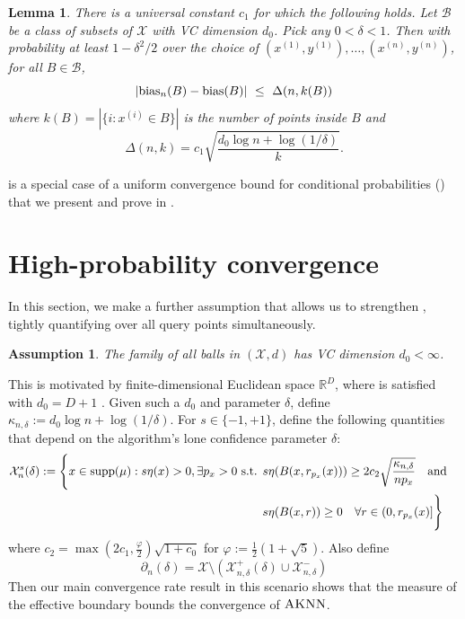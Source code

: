 \documentclass{article}
\def\X{{\mathcal X}}
\def\B{{\mathcal B}}
\def\bias{{\rm bias}}
\def\supp{{\rm supp}}
\newcommand{\algname}{\textsc{AKNN}}
\newtheorem{lemma}[theorem]{Lemma}
\newtheorem{assump}{Assumption}
\begin{document}
\begin{lemma}
There is a universal constant $c_1$ for which the following holds. Let $\B$ be a class of subsets of $\X$ with VC dimension $d_0$. Pick any $0 < \delta < 1$. Then with probability at least $1-\delta^2/2$ over the choice of $(x^{(1)}, y^{(1)}), \ldots, (x^{(n)}, y^{(n)})$, for all $B \in \B$,
  $$ \left| \bias_n(B) - \bias(B) \right| \ \leq \ \Delta(n, k(B)) $$
where $k(B) = |\{i: x^{(i)} \in B\}|$ is the number of points inside $B$ and 
\begin{equation}
\Delta(n,k) = c_1 \sqrt{\frac{d_0 \log n + \log (1/\delta)}{k}} .
\label{eq:delta-defn}
\end{equation}
\label{lemma:bias}
\end{lemma}

 is a special case of a uniform convergence bound for conditional probabilities () 
that we present and prove in .

\section{High-probability convergence}

In this section, we make a further assumption that allows us to strengthen , tightly quantifying over all query points simultaneously. 
\begin{assump}
\label{assump:VCallballs}
The family of all balls in $(\X, d)$ has VC dimension $d_0 < \infty$.
\end{assump}
This is motivated by finite-dimensional Euclidean space $\mathbb{R}^{D}$, where  is satisfied with $d_0 = D+1$ \citep{dudley79}. Given such a $d_0$ and parameter $\delta$, define $\kappa_{n, \delta} := d_0 \log n + \log (1/\delta)$. 
For $s \in \{ -1, +1 \}$, define the following quantities that depend on the algorithm's lone confidence parameter $\delta$:
\begin{align*}
\X^{s}_n (\delta)
:= \Bigg\{
x \in \supp(\mu) : s \eta(x) > 0 , \exists p_x > 0 \text{ s.t. } 
&s \eta(B(x,r_{p_x}(x))) \geq 2 c_2 \sqrt{\frac{ \kappa_{n, \delta} }{n p_x}}
\quad\text{and}\quad \\
&s \eta(B(x,r)) \geq 0 \quad\forall r \in (0, r_{p_x}(x)]
\Bigg\}
\end{align*}
where $c_2 = \max(2c_1, \frac{\varphi}{2} ) \sqrt{1 + c_0}$ for $\varphi := \frac{1}{2} (1 + \sqrt{5})$.
Also define 
$$ \partial_n (\delta) = \X \setminus (\X^+_{n,\delta} (\delta) \cup \X^-_{n,\delta}) $$
Then our main convergence rate result in this scenario shows that the measure of the effective boundary bounds the convergence of $\algname$.
\end{document}
